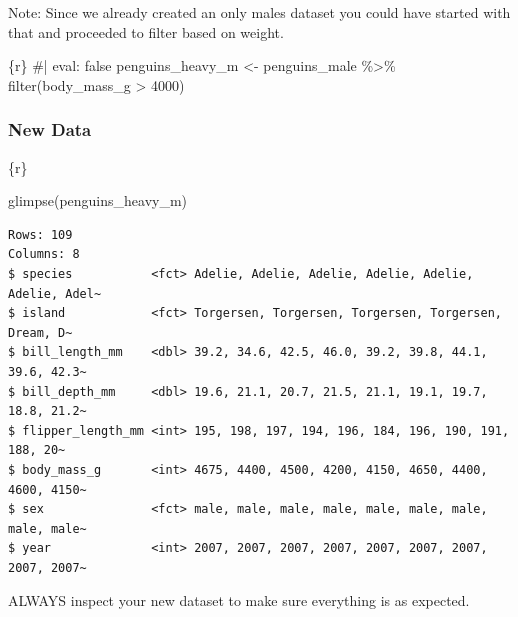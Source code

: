 \documentclass[
  letterpaper,
  DIV=11,
  numbers=noendperiod]{scrreprt}
\newenvironment{Shaded}{\begin{snugshade}}{\end{snugshade}}
\newcommand{\CommentTok}[1]{\textcolor[rgb]{0.37,0.37,0.37}{#1}}
\newcommand{\DecValTok}[1]{\textcolor[rgb]{0.68,0.00,0.00}{#1}}
\newcommand{\FunctionTok}[1]{\textcolor[rgb]{0.28,0.35,0.67}{#1}}
\newcommand{\InformationTok}[1]{\textcolor[rgb]{0.37,0.37,0.37}{#1}}
\newcommand{\NormalTok}[1]{\textcolor[rgb]{0.00,0.23,0.31}{#1}}
\newcommand{\OtherTok}[1]{\textcolor[rgb]{0.00,0.23,0.31}{#1}}
\newcommand{\SpecialCharTok}[1]{\textcolor[rgb]{0.37,0.37,0.37}{#1}}
\begin{document}
\begin{tcolorbox}[enhanced jigsaw, colframe=quarto-callout-note-color-frame, breakable, colback=white, toprule=.15mm, leftrule=.75mm, left=2mm, opacityback=0, rightrule=.15mm, arc=.35mm, bottomrule=.15mm]
Note: Since we already created an only males dataset you could have
started with that and proceeded to filter based on weight.

\begin{Shaded}
\begin{Highlighting}[]
\InformationTok{\textasciigrave{}\textasciigrave{}\textasciigrave{}\{r\}}
\CommentTok{\#| eval: false}
\NormalTok{penguins\_heavy\_m }\OtherTok{\textless{}{-}}\NormalTok{ penguins\_male }\SpecialCharTok{\%\textgreater{}\%} 
  \FunctionTok{filter}\NormalTok{(body\_mass\_g }\SpecialCharTok{\textgreater{}} \DecValTok{4000}\NormalTok{)}
\InformationTok{\textasciigrave{}\textasciigrave{}\textasciigrave{}}
\end{Highlighting}
\end{Shaded}

\hypertarget{new-data-1}{%
\subsubsection*{New Data}\label{new-data-1}}

\begin{Shaded}
\begin{Highlighting}[]
\InformationTok{\textasciigrave{}\textasciigrave{}\textasciigrave{}\{r\}}

\FunctionTok{glimpse}\NormalTok{(penguins\_heavy\_m)}
\InformationTok{\textasciigrave{}\textasciigrave{}\textasciigrave{}}
\end{Highlighting}
\end{Shaded}

\begin{verbatim}
Rows: 109
Columns: 8
$ species           <fct> Adelie, Adelie, Adelie, Adelie, Adelie, Adelie, Adel~
$ island            <fct> Torgersen, Torgersen, Torgersen, Torgersen, Dream, D~
$ bill_length_mm    <dbl> 39.2, 34.6, 42.5, 46.0, 39.2, 39.8, 44.1, 39.6, 42.3~
$ bill_depth_mm     <dbl> 19.6, 21.1, 20.7, 21.5, 21.1, 19.1, 19.7, 18.8, 21.2~
$ flipper_length_mm <int> 195, 198, 197, 194, 196, 184, 196, 190, 191, 188, 20~
$ body_mass_g       <int> 4675, 4400, 4500, 4200, 4150, 4650, 4400, 4600, 4150~
$ sex               <fct> male, male, male, male, male, male, male, male, male~
$ year              <int> 2007, 2007, 2007, 2007, 2007, 2007, 2007, 2007, 2007~
\end{verbatim}

ALWAYS inspect your new dataset to make sure everything is as expected.
\end{tcolorbox}
\end{document}
